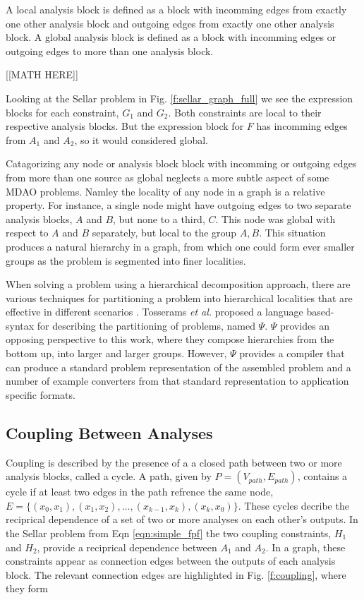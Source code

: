   A local analysis block is 
  defined as a block with incomming edges from exactly one other analysis 
  block and outgoing edges from exactly one other analysis block. A global 
  analysis block is defined as a block with incomming edges or outgoing edges 
  to more than one analysis block. 

  [[MATH HERE]]

  Looking at the Sellar problem in 
  Fig. \ref{f:sellar_graph_full} we see the expression blocks for each constraint, 
  $G_1$ and $G_2$. Both constraints are local to their respective analysis 
  blocks. But the expression block for $F$ has incomming edges from $A_1$ and 
  $A_2$, so it would considered global. 

  Catagorizing any node or analysis block block with incomming or outgoing edges
  from more than one source as global neglects a more 
  subtle aspect of some MDAO problems. Namley the locality of any node in a graph is 
  a relative property. For instance, a single node might have outgoing edges 
  to two separate analysis blocks, $A$ and $B$, but none to a third, $C$. This 
  node was global with respect to $A$ and $B$ separately, but local 
  to the group $A,B$. This situation produces a natural hierarchy in a graph, 
  from which one could form ever smaller groups as the problem is segmented into 
  finer localities. 

  When solving a problem using a hierarchical decomposition approach, 
  there are various techniques for partitioning a problem into hierarchical 
  localities that are effective in different scenarios 
  \cite{krishnamachari1997optimal,michelena1997hypergraph,sobieszczanski1997,Perez2004,allison2009optimal}. 
  Tosserams \textit{et al.} proposed a language based-syntax for describing the 
  partitioning of problems, named $\Psi$\cite{tosserams2010specification}. 
  $\Psi$ provides an opposing perspective to this work, where they compose 
  hierarchies from the bottom up, into larger and larger groups. However, 
  $\Psi$ provides a compiler that can produce a standard problem representation 
  of the assembled problem and a number of example converters from that 
  standard representation to application specific formats. 

\subsection{Coupling Between Analyses}
  Coupling is described by the presence of a a closed path between two or more
  analysis blocks, called a cycle. A path, given by $P=(V_{path},E_{path})$, 
  contains a cycle if at least two edges in the path refrence the same node, 
  $E = \{(x_0,x_1),(x_1,x_2),\ldots,(x_{k-1},x_k),(x_k,x_0)\}$. These cycles 
  decribe the reciprical dependence of a set of two or more analyses on each 
  other's outputs. In the Sellar problem from Eqn \ref{eqn:simple_fpf} the two 
  coupling constraints, $H_1$ and $H_2$, provide a reciprical dependence between 
  $A_1$ and $A_2$. In a graph, these constraints appear as connection edges between 
  the outputs of each analysis block. The relevant connection edges are highlighted in 
  Fig. \ref{f:coupling}, where they form 

